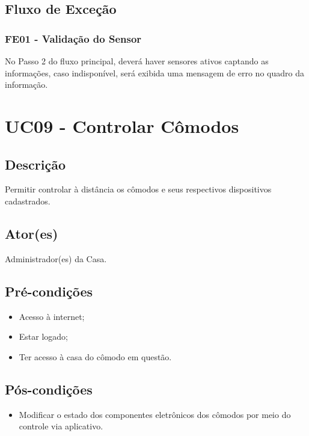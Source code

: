     \subsection{Fluxo de Exceção}
        \subsubsection{FE01 - Validação do Sensor}
            No Passo 2 do fluxo principal, deverá haver sensores ativos captando as informações, caso indisponível, será exibida uma mensagem de erro no quadro da informação.

\section{UC09 \-- Controlar Cômodos}
    \subsection{Descrição}
        Permitir controlar à distância os cômodos e seus respectivos dispositivos cadastrados.
    \subsection{Ator(es)}
        Administrador(es) da Casa.
    \subsection{Pré-condições}
        \begin{itemize}
            \item Acesso à internet;
            \item Estar logado;
            \item Ter acesso à casa do cômodo em questão.
        \end{itemize}
    \subsection{Pós-condições}
        \begin{itemize}
            \item Modificar o estado dos componentes eletrônicos dos cômodos por meio do controle via aplicativo.
        \end{itemize}
